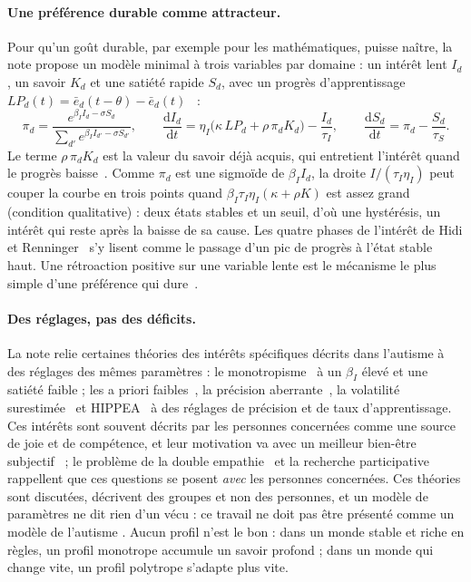 \documentclass[11pt,a4paper]{article}
\begin{document}
\paragraph{Une préférence durable comme attracteur.} Pour qu'un goût durable,
par exemple pour les mathématiques, puisse naître, la note propose un modèle minimal
à trois variables par domaine : un intérêt lent $I_d$, un savoir $K_d$ et une satiété
rapide $S_d$, avec un progrès d'apprentissage
$LP_d(t)=\bar e_d(t-\theta)-\bar e_d(t)$~\cite{oudeyer2007ieee} :
\begin{equation}
\pi_d=\frac{e^{\beta_I I_d-\sigma S_d}}{\sum_{d'}e^{\beta_I I_{d'}-\sigma S_{d'}}},\qquad
\frac{\mathrm dI_d}{\mathrm dt}=\eta_I\bigl(\kappa\,LP_d+\rho\,\pi_dK_d\bigr)-\frac{I_d}{\tau_I},\qquad
\frac{\mathrm dS_d}{\mathrm dt}=\pi_d-\frac{S_d}{\tau_S}.
\label{eq-interest}
\end{equation}
Le terme $\rho\,\pi_dK_d$ est la valeur du savoir déjà acquis, qui entretient
l'intérêt quand le progrès baisse~\cite{murayama2022}. Comme $\pi_d$ est une sigmoïde
de $\beta_I I_d$, la droite $I/(\tau_I\eta_I)$ peut couper la courbe en trois points
quand $\beta_I\tau_I\eta_I(\kappa+\rho K)$ est assez grand (condition qualitative) :
deux états stables et un seuil, d'où une hystérésis, un intérêt qui reste après la
baisse de sa cause. Les quatre phases de l'intérêt de Hidi et
Renninger~\cite{hidi2006} s'y lisent comme le passage d'un pic de progrès à l'état
stable haut. Une rétroaction positive sur une variable lente est le mécanisme le
plus simple d'une préférence qui dure~\cite{eldar2016}.

\paragraph{Des réglages, pas des déficits.} La note relie certaines théories des
intérêts spécifiques décrits dans l'autisme à des réglages des mêmes paramètres : le
monotropisme~\cite{murray2005} à un $\beta_I$ élevé et une satiété faible ; les a
priori faibles~\cite{pellicano2012}, la précision aberrante~\cite{lawson2014}, la
volatilité surestimée~\cite{lawson2017} et HIPPEA~\cite{vandecruys2014} à des
réglages de précision et de taux d'apprentissage. Ces intérêts sont souvent décrits
par les personnes concernées comme une source de joie et de compétence, et leur
motivation va avec un meilleur bien-être subjectif~\cite{grove2018} ; le problème de
la double empathie~\cite{milton2012} et la recherche participative~\cite{fletcherwatson2019}
rappellent que ces questions se posent \emph{avec} les personnes concernées. Ces
théories sont discutées, décrivent des groupes et non des personnes, et un modèle de
paramètres ne dit rien d'un vécu : ce travail ne doit pas être présenté comme un
\og modèle de l'autisme \fg{}. Aucun profil n'est le bon : dans un monde stable et
riche en règles, un profil monotrope accumule un savoir profond ; dans un monde qui
change vite, un profil polytrope s'adapte plus vite.
\end{document}
